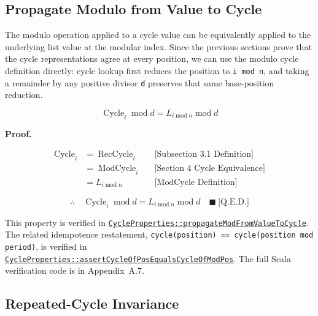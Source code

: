 \subsection{Propagate Modulo from Value to Cycle}

The modulo operation applied to a cycle value can be equivalently applied to
the underlying list value at the modular index. Since the previous sections
prove that the cycle representations agree at every position, we can use the
modulo cycle definition directly: cycle lookup first reduces the position to
\texttt{i mod n}, and taking a remainder by any positive divisor \texttt{d}
preserves that same base-position reduction.

\begin{equation*}
\operatorname{Cycle}_i\operatorname{mod}d
  =L_{i\operatorname{mod}n}\operatorname{mod}d
\end{equation*}

\noindent\textbf{Proof.}

\begin{equation*}
\begin{aligned}
\operatorname{Cycle}_i
  &=\operatorname{RecCycle}_i && \text{[Subsection 3.1 Definition]} \\
  &=\operatorname{ModCycle}_i && \text{[Section 4 Cycle Equivalence]} \\
  &=L_{i\operatorname{mod}n} && \text{[ModCycle Definition]}
\end{aligned}
\end{equation*}

\begin{equation*}
\therefore\quad
\operatorname{Cycle}_i\operatorname{mod}d
  =L_{i\operatorname{mod}n}\operatorname{mod}d
  \quad \blacksquare\ \text{[Q.E.D.]}
\end{equation*}

This property is verified in
\href{https://github.com/thiagomata/prime-numbers/blob/cycle-article-v1.0.0/src/main/scala/v1/chapter4/cycle/properties/CycleProperties.scala}{\texttt{CycleProperties::propagateModFromValueToCycle}}.
The related idempotence restatement,
\texttt{cycle(position) == cycle(position mod period)}, is verified in
\href{https://github.com/thiagomata/prime-numbers/blob/cycle-article-v1.0.0/src/main/scala/v1/chapter4/cycle/properties/CycleProperties.scala}{\texttt{CycleProperties::assertCycleOfPosEqualsCycleOfModPos}}.
The full Scala verification code is in Appendix~A.7.

\subsection{Repeated-Cycle Invariance}

